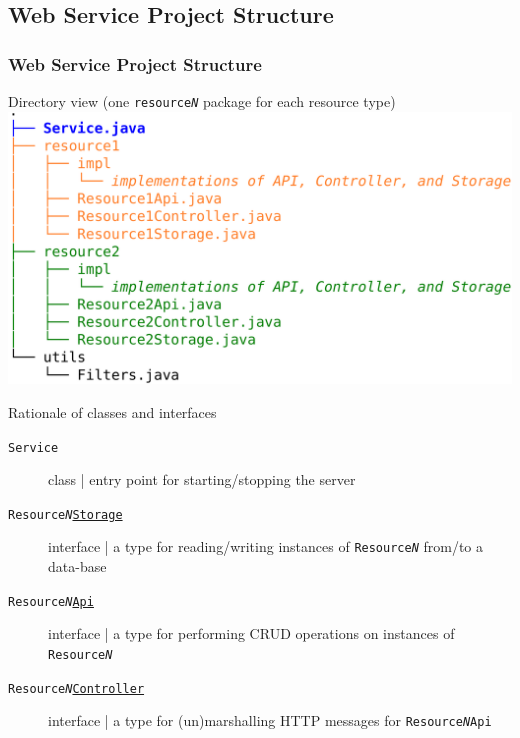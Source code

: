 \documentclass[presentation]{beamer}\mode<presentation>{\usetheme{AMSBolognaFC}}
\begin{document}
\subsection{Web Service Project Structure}

\begin{frame}[allowframebreaks]\frametitle{Web Service Project Structure}
    \begin{block}{Directory view (one \texttt{resource\textit{N}} package for each resource type)}\centering
        \includegraphics[width=.8\linewidth]{./img/ws-structure.pdf}
    \end{block}

    \begin{block}{Rationale of classes and interfaces}
        \begin{description}
            \item[\texttt{Service}] class | entry point for starting/stopping the server
            \item[\texttt{Resource\textit{N}\underline{Storage}}] interface | a type for reading/writing instances of \texttt{Resource\textit{N}} from/to a data-base
            \item[\texttt{Resource\textit{N}\underline{Api}}] interface | a type for performing CRUD operations on instances of \texttt{Resource\textit{N}}
            \item[\texttt{Resource\textit{N}\underline{Controller}}] interface | a type for (un)marshalling HTTP messages for \texttt{Resource\textit{N}Api}
        \end{description}
    \end{block}


\end{frame}
\end{document}
